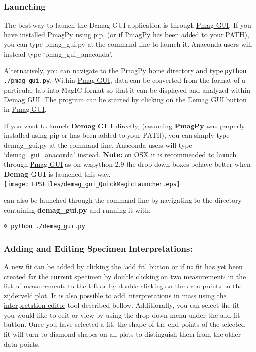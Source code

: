 \documentclass[11pt]{book}
\begin{document}
{{\subsubsection{Launching}\label{launching}

The best way to launch the Demag GUI application is through  \href{#pmag_gui.py}{Pmag GUI}. If you have installed PmagPy using pip, (or if PmagPy has been added to your PATH), you can type pmag\_gui.py at the command line to launch it.  Anaconda users will instead type `pmag\_gui\_anaconda'.

\noindent Alternatively, you can navigate to the PmagPy home directory  and type \texttt{python  ./pmag\_gui.py}. Within \href{#pmag_gui.py}{Pmag GUI}, data can be converted from the format of a particular lab into MagIC format so that it can be displayed and analyzed within Demag GUI. The program can be started by clicking on the Demag GUI button in \href{#pmag_gui.py}{Pmag GUI}.


\noindent If you want to launch {\bf Demag GUI} directly, (assuming {\bf PmagPy} was properly installed using pip or has been added to your PATH), you can simply type
demag\_gui.py at the command line. Anaconda users will type `demag\_gui\_anaconda' instead.  \textbf{Note:} on OSX it is
recommended to launch through \href{#pmag_gui.py}{Pmag GUI} as on wxpython 2.9 the drop-down boxes behave better when {\bf Demag GUI} is launched this way.\\


\texttt{[image: EPSFiles/demag\_gui\_QuickMagicLauncher.eps]}

 can also be launched through the command line by navigating to the directory containing {\bf demag\_gui.py}  and running it with:\\

\begin{verbatim}
% python ./demag_gui.py
\end{verbatim}



\subsubsection{Adding and Editing Specimen Interpretations:}\label{adding-interpretations}

A new fit can be added by clicking the `add fit' button or if no fit has yet been created for the current specimen by double clicking on two measurements in the list of measurements to the left or by double clicking on the data points on the zijderveld plot. It is also possible to add interpretations in mass using the \hyperref[interpretation-editor]{interpretation editor} tool described bellow. Additionally, you can select the fit you would like to edit or view by using the drop-down menu under the add fit button. Once you have selected a fit, the shape of the end points of the selected fit will turn to diamond shapes on all plots to distinguish them from the other data points.\\

}}
\end{document}
